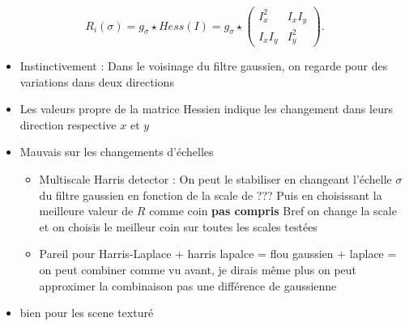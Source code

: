 \documentclass{article}
\theoremstyle{plain}%
\theoremstyle{definition}
\theoremstyle{remark}
\begin{document}
\[
    R_i(\sigma ) = g_\sigma \star Hess(I) = g_\sigma \star \begin{pmatrix}
        I_x^2 & I_x I_y \\
        I_x I_y & I_y^2
    \end{pmatrix}
.\]
\begin{itemize}
    \item Instinctivement : Dans le voisinage du filtre gaussien, on regarde pour des variations dans deux directions
    \item Les valeurs propre de la matrice Hessien indique les changement dans leurs direction respective $ x $ et $ y $ 
    \item Mauvais sur les changements d'échelles \begin{itemize}
        \item Multiscale Harris detector : On peut le stabiliser en changeant l'échelle $ \sigma  $ du filtre gaussien en fonction de la scale de ??? Puis en choisissant la meilleure valeur de $ R $ comme coin \textbf{pas compris} Bref on change la scale et on choisis le meilleur coin sur toutes les scales testées
        \item Pareil pour Harris-Laplace + harris lapalce = flou gaussien + laplace = on peut combiner comme vu avant, je dirais même plus on peut approximer la combinaison pas une différence de gaussienne
    \end{itemize}
    \item bien pour les scene texturé
\end{itemize}
\end{document}
